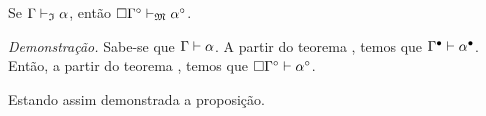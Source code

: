     \vspace{.5\baselineskip}
    \begin{tcolorbox}[enhanced jigsaw, breakable, sharp corners, colframe=black, colback=white, boxrule=0.5pt, left=1.5mm, right=1.5mm, top=1.5mm, bottom=1.5mm]
    \begin{theorem}[Correção]\label{circle.soundness}
        Se $\Gamma\mathrel{\vdash}_\mathfrak{I}\alpha$, então $\Box\Gamma^\circ\mathrel{\vdash}_\mathfrak{M}\alpha^\circ$.
    \end{theorem}
        \emph{Demonstração.} Sabe-se que $\Gamma\mathrel{\vdash}\alpha$. A partir do teorema , temos que $\Gamma^\bullet\mathrel{\vdash}\alpha^\bullet$.
        Então, a partir do teorema , temos que $\Box\Gamma^\circ\mathrel{\vdash}\alpha^\circ$.

        \vspace{.5\baselineskip}
        Estando assim demonstrada a proposição.
    \end{tcolorbox}
